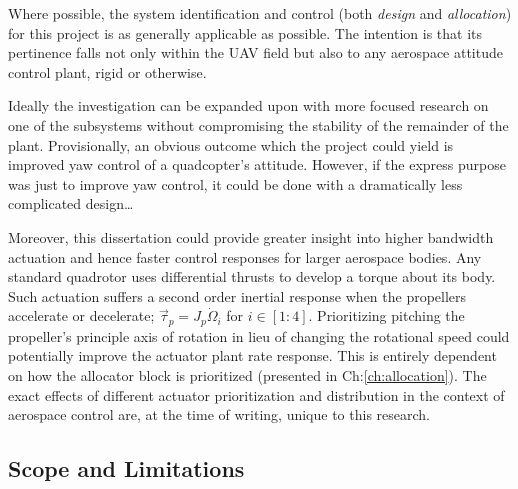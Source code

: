 \par
Where possible, the system identification and control (both \emph{design} and \emph{allocation}) for this project is as generally applicable as possible. The intention is that its pertinence falls not only within the UAV field but also to any aerospace attitude control plant, rigid or otherwise. 
\par
Ideally the investigation can be expanded upon with more focused research on one of the subsystems without compromising the stability of the remainder of the plant. Provisionally, an obvious outcome which the project could yield is improved yaw control of a quadcopter's attitude. However, if the express purpose was just to improve yaw control, it could be done with a dramatically less complicated design\ldots
\par
Moreover, this dissertation could provide greater insight into higher bandwidth actuation and hence faster control responses for larger aerospace bodies. Any standard quadrotor uses differential thrusts to develop a torque about its body. Such actuation suffers a second order inertial response when the propellers accelerate or decelerate; $\vec{\tau}_{p}=J_p\dot{\Omega}_i$ for $i\in[1:4]$. Prioritizing pitching the propeller's principle axis of rotation in lieu of changing the rotational speed could potentially improve the actuator plant rate response. This is entirely dependent on how the allocator block is prioritized (presented in Ch:\ref{ch:allocation}). The exact effects of different actuator prioritization and distribution in the context of aerospace control are, at the time of writing, unique to this research.
\subsection{Scope and Limitations}
\label{subsec:intro.foreword.scopeandlim}
